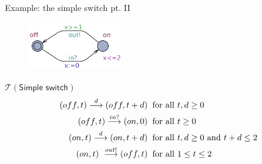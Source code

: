 \documentclass{beamer}
\def\TL#1{\mathcal{T}(#1)}
\begin{document}
\begin{slide}{Example: the simple switch pt. II}

\begin{figure}[htb]
  \centering
  \includegraphics[width=4cm]{./images/SwitchA.pdf}\\
\end{figure}
\vfill
\begin{block}{$\TL{\textsf{Simple switch}}$}
\begin{align*}
(off,t) \stackrel{d}{\longrightarrow} (off,t+d)\; & \; \text{for all $t,d \geq 0$}\\
(off,t) \stackrel{in?}{\longrightarrow} (on,0)\; & \; \text{for all $t \geq 0$}\\
(on,t) \stackrel{d}{\longrightarrow} (on,t+d)\; & \; \text{for all $t,d \geq 0$ and $t+d \leq 2$}\\
(on,t) \ \stackrel{out!}{\longrightarrow} (off,t)\; & \; \text{for all $1 \leq t \leq 2$}
\end{align*}
\end{block}
\end{slide}
\end{document}
